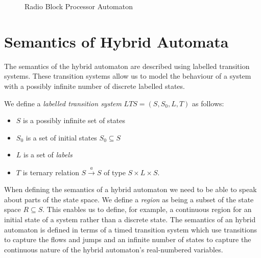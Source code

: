\begin{figure} [H]
\begin{center}
\begin{tikzpicture}[node distance = 1cm]
\end{tikzpicture} 
\end{center}
\caption{Radio Block Processor Automaton}
\label{fig:RBCAuton}
\end{figure}



\section{Semantics of Hybrid Automata} \label{sec:hyseman}

The semantics of the hybrid automaton are described using labelled transition systems. These transition systems allow us to model the behaviour of a system with a possibly infinite number of discrete labelled states. 
\medskip
\begin{mydef}
We define a \emph{labelled transition system} $LTS = (S,S_0,L,T)$ as follows:
\begin{itemize}

\item $S$ is a possibly infinite set of states

\item $S_0$ is a set of initial states $S_0 \subseteq S$

\item $L$ is a set of \emph{labels}

\item $T$ is ternary  relation $S \xrightarrow{a} S$ of type $S \times L \times S$.

\end{itemize}
\end{mydef}
\medskip
When defining the semantics of a hybrid automaton we need to be able to speak about parts of the state space.  We define a \emph{region} as being a subset of the state space $R \subseteq S$.  This enables us to define, for example, a continuous region for an initial state of a system rather than a discrete state. The semantics of an hybrid automaton is defined in terms of a timed transition system which use transitions to capture the flows and jumps and an infinite number of states to capture the continuous nature of the hybrid automaton's real-numbered variables.

